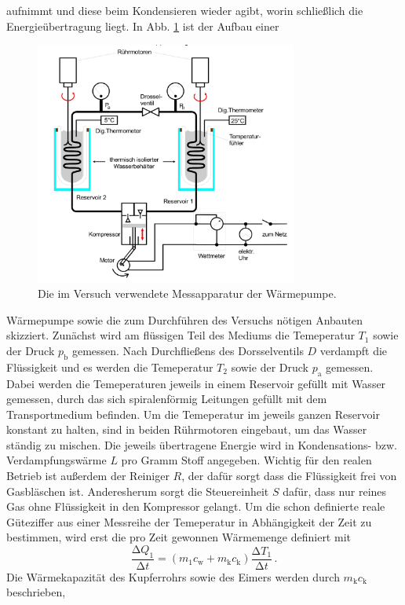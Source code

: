 aufnimmt und diese beim Kondensieren wieder agibt, worin schließlich die 
Energieübertragung liegt. In Abb. \ref{fig:Messapparatur} ist der Aufbau einer
\begin{figure}
    \centering
    \includegraphics[height=8cm]{messdaten/Messapparatur.png}
    \caption{Die im Versuch verwendete Messapparatur der Wärmepumpe.}
    \label{fig:Messapparatur}
\end{figure}
Wärmepumpe sowie die zum Durchführen des Versuchs nötigen Anbauten skizziert.
Zunächst wird am flüssigen Teil des Mediums die Temeperatur $T_1$ sowie der Druck
$p_\text{b}$ gemessen. Nach Durchfließens des Dorsselventils $D$ verdampft die 
Flüssigkeit und es werden die Temeperatur $T_2$ sowie der Druck $p_\text{a}$ 
gemessen. Dabei werden die Temeperaturen jeweils in einem Reservoir gefüllt mit 
Wasser gemessen, durch das sich spiralenförmig Leitungen gefüllt mit dem Transportmedium 
befinden. Um die Temeperatur im jeweils ganzen Reservoir konstant zu halten, sind in beiden 
Rührmotoren eingebaut, um das Wasser ständig zu mischen. Die jeweils übertragene Energie
wird in Kondensations- bzw. Verdampfungswärme $L$ pro Gramm Stoff angegeben.
Wichtig für den realen Betrieb ist außerdem der Reiniger $R$, der dafür sorgt dass die
Flüssigkeit frei von Gasbläschen ist. Anderesherum sorgt die Steuereinheit $S$ dafür,
dass nur reines Gas ohne Flüssigkeit in den Kompressor gelangt.
Um die schon definierte reale Güteziffer aus einer Messreihe der Temeperatur in 
Abhängigkeit der Zeit zu bestimmen, wird erst die pro Zeit gewonnen Wärmemenge definiert mit
\begin{equation}
    \frac{\increment Q_1}{\increment t}=(m_1c_\text{w}+m_\text{k}c_\text{k})\frac{\increment T_1}{\increment t}\,.
\end{equation}
Die Wärmekapazität des Kupferrohrs sowie des Eimers werden durch $m_\text{k}c_\text{k}$ beschrieben,
